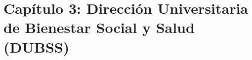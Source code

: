 
\newpage
\section{Capítulo 3: Dirección Universitaria de Bienestar Social y Salud (DUBSS)}\label{cap:empresa}








